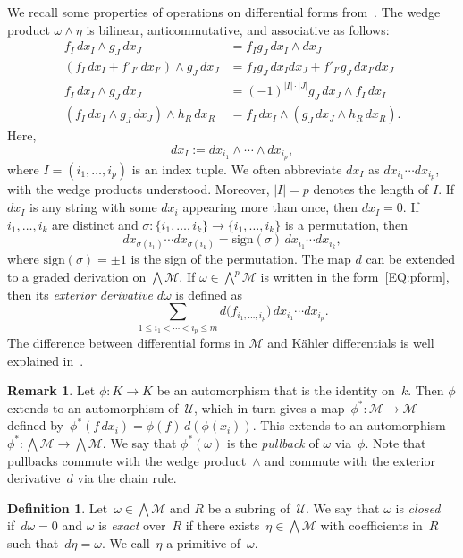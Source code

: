 \documentclass{amsart}
\theoremstyle{definition}
\newtheorem{defin}[thm]{Definition}
\newtheorem{remark}[thm]{Remark}
\numberwithin{equation}{section}
\numberwithin{thm}{section}
\begin{document}
We recall some properties of operations on differential forms from~\cite{Weintraub,Cartan}. The wedge product $\omega  \wedge \eta$ is bilinear, anticommutative, and associative as follows:
\begin{align*}
	f_{I}\, dx_{I} \wedge g_{J} \, dx_{J} & = f_{I} g_{J} \, dx_{I}\wedge dx_{J}\\
	(f_{I}\,dx_{I}+f'_{I'}\,dx_{I'}) \wedge g_{J}\, dx_{J} &= f_{I}g_{J} \, dx_{I}dx_{J} + f'_{I'}g_{J} \, dx_{I'} dx_{J}\\
	f_{I} \, dx_{I} \wedge g_{J}\, dx_{J} & = (-1)^{|I|\cdot|J|} g_{J} \, dx_{J} \wedge f_{I} \, dx_{I}\\
	(f_{I} \, dx_{I} \wedge g_{J}\, dx_{J}) \wedge h_{R}\, dx_{R} & = f_{I} \, dx_{I} \wedge ( g_{J}\, dx_{J} \wedge h_{R}\, dx_{R}).
\end{align*}
Here,
\[
dx_I:=dx_{i_1}\wedge\cdots\wedge dx_{i_p},
\]
where $I=(i_1,\ldots,i_p)$ is an index tuple. We often abbreviate $dx_I$ as $dx_{i_1}\cdots dx_{i_p}$, with the wedge products understood. Moreover, $|I|=p$ denotes the length of $I$.
If $dx_I$ is any string with some $dx_i$ appearing more than once, then $dx_I=0$.
If $i_1,\ldots,i_k$ are distinct and $\sigma \colon \{i_1,\ldots,i_k\} \rightarrow \{i_1,\ldots,i_k\}$ is a permutation, then
\[dx_{\sigma(i_1)}\cdots dx_{\sigma(i_k)}=\mathrm{sign}(\sigma)\,dx_{i_1}\cdots dx_{i_k},\]
where $\mathrm{sign}(\sigma)=\pm 1$ is the sign of the permutation.
The map $d$ can be extended to a graded derivation on $\bigwedge \mathcal{M}$. 
If $\omega \in \bigwedge^p \mathcal{M}$ is written in the form~\eqref{EQ:pform}, then its \textit{exterior derivative} $d\omega$ is defined as 
\[
     \sum_{1 \leq i_1 < \cdots < i_p \leq m} 
     d\bigl(f_{i_1,\ldots,i_p}\bigr) \,dx_{i_1} \cdots dx_{i_p} .
\]
%
The difference between differential forms in $\mathcal{M}$ and K\"ahler differentials is well explained in~\cite{Li2011}.
\begin{remark}\label{RMK:pullback}
Let $\phi \colon K \rightarrow K$ be an automorphism that is the identity on~$k$. Then $\phi$ extends to an automorphism of~$\mathcal{U}$, which in turn gives a map~$\phi^* \colon \mathcal{M} \rightarrow \mathcal{M}$ defined by~$\phi^*(f \, dx_i) = \phi(f) \, d(\phi(x_i))$. This extends to an automorphism~$\phi^* \colon \bigwedge \mathcal{M} \rightarrow \bigwedge \mathcal{M}$. We say that $\phi^*(\omega)$ is the \textit{pullback} of $\omega$ via~$\phi$. Note that pullbacks commute with the wedge product~$\wedge$ and commute with the exterior derivative~$d$ via the chain rule.
\end{remark}
\begin{defin}
	Let~$\omega \in \bigwedge \mathcal{M} $ and $R$ be a subring of~$\mathcal{U}$. We say that $\omega$ is \textit{closed} if~$d \omega = 0 $ and $\omega $ is \textit{exact} over~$R$ if there exists~$\eta \in \bigwedge \mathcal{M}$ with coefficients in~$R$ such that~$d\eta = \omega$. We call~$\eta$ a primitive of~$\omega$.
\end{defin}
\end{document}
